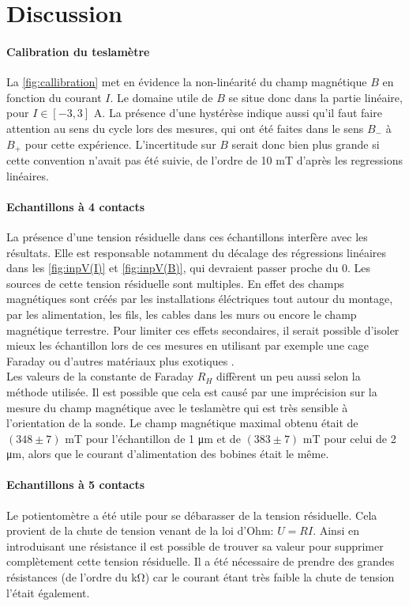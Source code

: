 \section{Discussion}

\paragraph*{Calibration du teslamètre}
La \autoref{fig:callibration} met en évidence la non-linéarité du champ magnétique \(B\) en fonction du courant \(I\). Le domaine utile de \(B\) se situe donc dans la partie linéaire, pour \(I \in [-3, 3]\) \si{\ampere}. La présence d'une hystérèse indique aussi qu'il faut faire attention au sens du cycle lors des mesures, qui ont été faites dans le sens \(B_-\) à \(B_+\) pour cette expérience. L'incertitude sur \(B\) serait donc bien plus grande si cette convention n'avait pas été suivie, de l'ordre de 10 \si{\milli\tesla} d'après les regressions linéaires.

\paragraph*{Echantillons à 4 contacts}
La présence d'une tension résiduelle dans ces échantillons interfère avec les résultats. Elle est responsable notamment du décalage des régressions linéaires dans les \autoref{fig:inpV(I)} et \autoref{fig:inpV(B)}, qui devraient passer proche du 0. Les sources de cette tension résiduelle sont multiples. En effet des champs magnétiques sont créés par les installations éléctriques tout autour du montage, par les alimentation, les fils, les cables dans les murs ou encore le champ magnétique terrestre. Pour limiter ces effets secondaires, il serait possible d'isoler mieux les échantillon lors de ces mesures en utilisant par exemple une cage Faraday ou d'autres matériaux plus exotiques \cite{em_shielding}.\\
Les valeurs de la constante de Faraday \(R_H\) diffèrent un peu aussi selon la méthode utilisée. Il est possible que cela est causé par une imprécision sur la mesure du champ magnétique avec le teslamètre qui est très sensible à l'orientation de la sonde. Le champ magnétique maximal obtenu était de \((348 \pm 7)\) \si{\milli\tesla} pour l'échantillon de 1 \si{\micro\meter} et de \((383 \pm 7)\) \si{\milli\tesla} pour celui de 2 \si{\micro\meter}, alors que le courant d'alimentation des bobines était le même.


\paragraph*{Echantillons à 5 contacts}
Le potientomètre a été utile pour se débarasser de la tension résiduelle. Cela provient de la chute de tension venant de la loi d'Ohm: \(U = R I\). Ainsi en introduisant une résistance il est possible de trouver sa valeur pour supprimer complètement cette tension résiduelle. Il a été nécessaire de prendre des grandes résistances (de l'ordre du \si{\kilo \ohm}) car le courant étant très faible la chute de tension l'était également.

